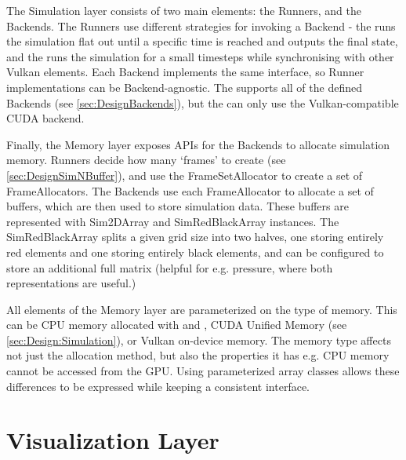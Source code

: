 The Simulation layer consists of two main elements: the Runners, and the Backends.
The Runners use different strategies for invoking a Backend - the  runs the simulation flat out until a specific time is reached and outputs the final state, and the  runs the simulation for a small timesteps while synchronising with other Vulkan elements.
Each Backend implements the same interface, so Runner implementations can be Backend-agnostic.
The  supports all of the defined Backends (see \cref{sec:DesignBackends}), but the  can only use the Vulkan-compatible CUDA backend.

Finally, the Memory layer exposes APIs for the Backends to allocate simulation memory.
Runners decide how many `frames' to create (see \cref{sec:DesignSimNBuffer}), and use the FrameSetAllocator to create a set of FrameAllocators.
The Backends use each FrameAllocator to allocate a set of buffers, which are then used to store simulation data.
These buffers are represented with Sim2DArray and SimRedBlackArray instances.
The SimRedBlackArray splits a given grid size into two halves, one storing entirely red elements and one storing entirely black elements, and can be configured to store an additional full matrix (helpful for e.g. pressure, where both representations are useful.)

All elements of the Memory layer are parameterized on the type of memory.
This can be CPU memory allocated with  and , CUDA Unified Memory (see \cref{sec:Design:Simulation}), or Vulkan on-device memory. 
The memory type affects not just the allocation method, but also the properties it has e.g. CPU memory cannot be accessed from the GPU.
Using parameterized array classes allows these differences to be expressed while keeping a consistent interface.



\pagebreak
\section{Visualization Layer}



